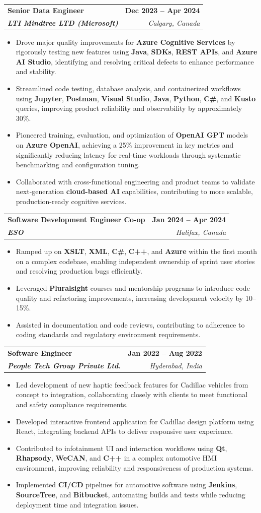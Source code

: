 \documentclass[letterpaper,11pt]{article}
\makeatletter
\newcommand{\resumeItem}[1]{
  \item\small{
    {#1 \vspace{-2pt}}
  }
}
\newcommand{\resumeSubheading}[4]{
  \vspace{-2pt}\item
    \begin{tabular*}{1.0\textwidth}[t]{l@{\extracolsep{\fill}}r}
      \textbf{#1} & \textbf{\small #2} \\
      \textit{\small#3} & \textit{\small #4} \\
    \end{tabular*}\vspace{-7pt}
}
\newcommand{\resumeItemListStart}{\begin{itemize}}
\newcommand{\resumeItemListEnd}{\end{itemize}\vspace{-5pt}}
\makeatother
\begin{document}
    \resumeSubheading
      {\textbf{Senior Data Engineer}}{\textbf{Dec 2023 -- Apr 2024}}
      {\textbf{LTI Mindtree LTD (Microsoft)}}{Calgary, Canada}
      \resumeItemListStart
        \resumeItem{Drove major quality improvements for \textbf{Azure Cognitive Services} by rigorously testing new features using \textbf{Java}, \textbf{SDKs}, \textbf{REST APIs}, and \textbf{Azure AI Studio}, identifying and resolving critical defects to enhance performance and stability.}
        \resumeItem{Streamlined code testing, database analysis, and containerized workflows using \textbf{Jupyter}, \textbf{Postman}, \textbf{Visual Studio}, \textbf{Java}, \textbf{Python}, \textbf{C\#}, and \textbf{Kusto} queries, improving product reliability and observability by approximately 30\%.}
        \resumeItem{Pioneered training, evaluation, and optimization of \textbf{OpenAI GPT} models on \textbf{Azure OpenAI}, achieving a 25\% improvement in key metrics and significantly reducing latency for real-time workloads through systematic benchmarking and configuration tuning.}
        \resumeItem{Collaborated with cross-functional engineering and product teams to validate next-generation \textbf{cloud-based AI} capabilities, contributing to more scalable, production-ready cognitive services.}
      \resumeItemListEnd
    
    \resumeSubheading
      {\textbf{Software Development Engineer Co-op}}{\textbf{Jan 2024 -- Apr 2024}}
      {\textbf{ESO}}{Halifax, Canada}
      \resumeItemListStart
        \resumeItem{Ramped up on \textbf{XSLT}, \textbf{XML}, \textbf{C\#}, \textbf{C++}, and \textbf{Azure} within the first month on a complex codebase, enabling independent ownership of sprint user stories and resolving production bugs efficiently.}
        \resumeItem{Leveraged \textbf{Pluralsight} courses and mentorship programs to introduce code quality and refactoring improvements, increasing development velocity by 10--15\%.}
        \resumeItem{Assisted in documentation and code reviews, contributing to adherence to coding standards and regulatory environment requirements.}
      \resumeItemListEnd

    \resumeSubheading
      {\textbf{Software Engineer}}{\textbf{Jan 2022 -- Aug 2022}}
      {\textbf{People Tech Group Private Ltd.}}{Hyderabad, India}
      \resumeItemListStart
        \resumeItem{Led development of new haptic feedback features for Cadillac vehicles from concept to integration, collaborating closely with clients to meet functional and safety compliance requirements.}
        \resumeItem{Developed interactive frontend application for Cadillac design platform using React, integrating backend APIs to deliver responsive user experience.}
        \resumeItem{Contributed to infotainment UI and interaction workflows using \textbf{Qt}, \textbf{Rhapsody}, \textbf{WeCAN}, and \textbf{C++} in a complex automotive HMI environment, improving reliability and responsiveness of production systems.}
        \resumeItem{Implemented \textbf{CI/CD} pipelines for automotive software using \textbf{Jenkins}, \textbf{SourceTree}, and \textbf{Bitbucket}, automating builds and tests while reducing deployment time and integration issues.}
      \resumeItemListEnd
\end{document}

